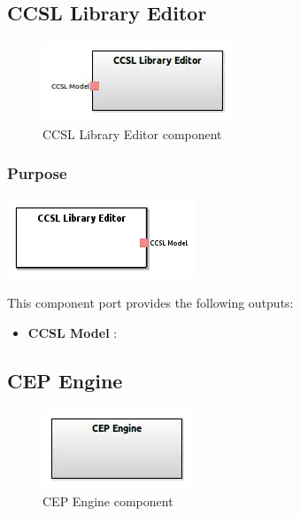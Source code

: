 \documentclass{gemoc} %
\begin{document}
\subsection{CCSL Library Editor}

\begin{figure}[htp]
	\begin{center}
	\includegraphics*[trim=0.0cm 0.0cm 0cm 0.0cm, clip=true, scale=1.0]{../images/generated/Generated_CCSL Library Editor.jpg}
	\caption{CCSL Library Editor component}
	\end{center}
\end{figure}

\subsubsection{Purpose}

\begin{center}
\includegraphics*[trim=0.0cm 0.0cm 0cm 0.0cm, clip=true]{../images/generated/Generated_CCSL_Library_Editor.png}
\end{center}


This component port provides the following outputs:
\begin{itemize}
  \item \textbf{CCSL Model} :
\end{itemize}

\subsection{CEP Engine}

\begin{figure}[htp]
	\begin{center}
	\includegraphics*[trim=0.0cm 0.0cm 0cm 0.0cm, clip=true, scale=1.0]{../images/generated/Generated_CEP Engine.jpg}
	\caption{CEP Engine component}
	\end{center}
\end{figure}
\end{document}
